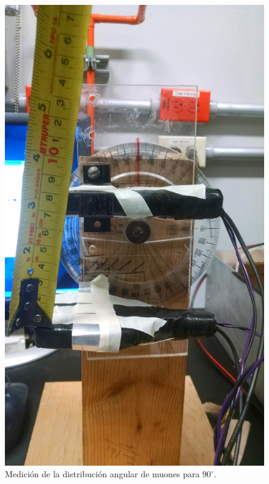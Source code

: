 \documentclass[a4paper,10pt]{article}
\numberwithin{equation}{section}
\begin{document}
\begin{figure}[H]
 \center 
 \includegraphics[scale=0.13]{Imagenes/angulo2}
 \caption{Medición de la distribución angular de muones para $90^\circ$.}
\end{figure}
\end{document}

